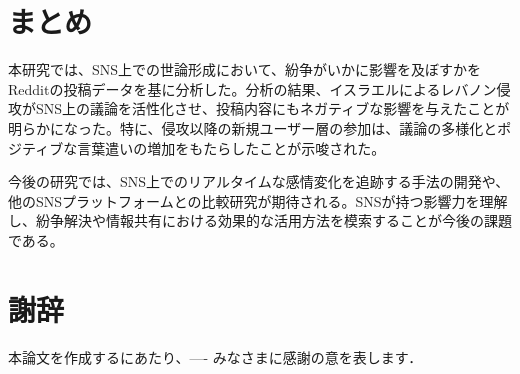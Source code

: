 \documentclass[11pt, a4j]{jreport}
\begin{document}
    \chapter{まとめ}

    本研究では、SNS上での世論形成において、紛争がいかに影響を及ぼすかをRedditの投稿データを基に分析した。分析の結果、イスラエルによるレバノン侵攻がSNS上の議論を活性化させ、投稿内容にもネガティブな影響を与えたことが明らかになった。特に、侵攻以降の新規ユーザー層の参加は、議論の多様化とポジティブな言葉遣いの増加をもたらしたことが示唆された。

    今後の研究では、SNS上でのリアルタイムな感情変化を追跡する手法の開発や、他のSNSプラットフォームとの比較研究が期待される。SNSが持つ影響力を理解し、紛争解決や情報共有における効果的な活用方法を模索することが今後の課題である。

    \chapter*{謝辞} %
    本論文を作成するにあたり、---- みなさまに感謝の意を表します．


    \renewcommand{\bibname}{参考文献} %
\end{document}

